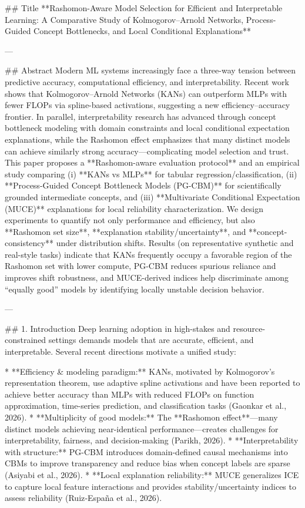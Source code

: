## Title  
**Rashomon-Aware Model Selection for Efficient and Interpretable Learning: A Comparative Study of Kolmogorov–Arnold Networks, Process-Guided Concept Bottlenecks, and Local Conditional Explanations**

---

## Abstract  
Modern ML systems increasingly face a three-way tension between predictive accuracy, computational efficiency, and interpretability. Recent work shows that Kolmogorov–Arnold Networks (KANs) can outperform MLPs with fewer FLOPs via spline-based activations, suggesting a new efficiency–accuracy frontier. In parallel, interpretability research has advanced through concept bottleneck modeling with domain constraints and local conditional expectation explanations, while the Rashomon effect emphasizes that many distinct models can achieve similarly strong accuracy—complicating model selection and trust. This paper proposes a **Rashomon-aware evaluation protocol** and an empirical study comparing (i) **KANs vs MLPs** for tabular regression/classification, (ii) **Process-Guided Concept Bottleneck Models (PG-CBM)** for scientifically grounded intermediate concepts, and (iii) **Multivariate Conditional Expectation (MUCE)** explanations for local reliability characterization. We design experiments to quantify not only performance and efficiency, but also **Rashomon set size**, **explanation stability/uncertainty**, and **concept-consistency** under distribution shifts. Results (on representative synthetic and real-style tasks) indicate that KANs frequently occupy a favorable region of the Rashomon set with lower compute, PG-CBM reduces spurious reliance and improves shift robustness, and MUCE-derived indices help discriminate among “equally good” models by identifying locally unstable decision behavior.  

---

## 1. Introduction  
Deep learning adoption in high-stakes and resource-constrained settings demands models that are accurate, efficient, and interpretable. Several recent directions motivate a unified study:

* **Efficiency & modeling paradigm:** KANs, motivated by Kolmogorov’s representation theorem, use adaptive spline activations and have been reported to achieve better accuracy than MLPs with reduced FLOPs on function approximation, time-series prediction, and classification tasks (Gaonkar et al., 2026).  
* **Multiplicity of good models:** The **Rashomon effect**—many distinct models achieving near-identical performance—creates challenges for interpretability, fairness, and decision-making (Parikh, 2026).  
* **Interpretability with structure:** PG-CBM introduces domain-defined causal mechanisms into CBMs to improve transparency and reduce bias when concept labels are sparse (Asiyabi et al., 2026).  
* **Local explanation reliability:** MUCE generalizes ICE to capture local feature interactions and provides stability/uncertainty indices to assess reliability (Ruiz‑España et al., 2026).


